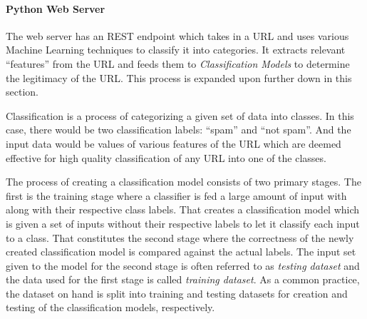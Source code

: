 \documentclass[conference]{IEEEtran}
\begin{document}
\paragraph{Python Web Server}
The web server has an REST endpoint which takes in a URL and uses various Machine Learning techniques to classify it into categories.
It extracts relevant ``features'' from the URL and feeds them to \emph{Classification Models} to determine the legitimacy of the URL.
This process is expanded upon further down in this section.

\par Classification is a process of categorizing a given set of data into classes.
In this case, there would be two classification labels: ``spam'' and ``not spam''.
And the input data would be values of various features of the URL which are deemed effective for high quality classification of any URL into one of the classes.


\par The process of creating a classification model consists of two primary stages.
The first is the training stage where a classifier is fed a large amount of input with along with their respective class labels.
That creates a classification model which is given a set of inputs without their respective labels to let it classify each input to a class.
That constitutes the second stage where the correctness of the newly created classification model is compared against the actual labels.
The input set given to the model for the second stage is often referred to as \emph{testing dataset} and the data used for the first stage is called \emph{training dataset}.
As a common practice, the dataset on hand is split into training and testing datasets for creation and testing of the classification models, respectively.
\end{document}
